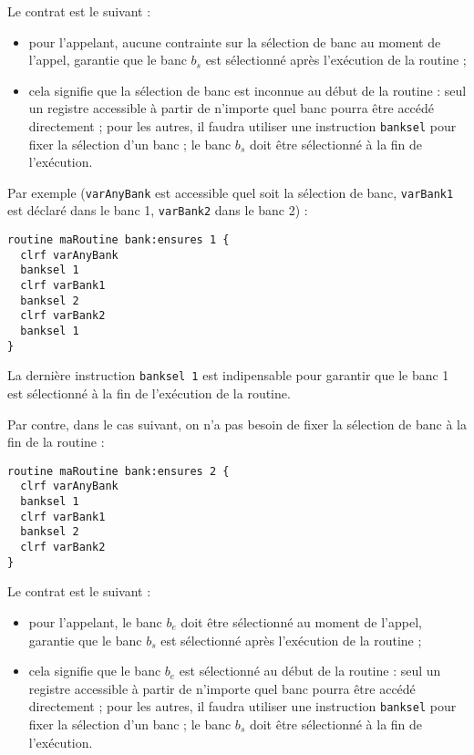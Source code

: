 Le contrat est le suivant :
\begin{itemize}
  \item pour l'appelant, aucune contrainte sur la sélection de banc au moment de l'appel, garantie que le banc $b_s$ est sélectionné après l'exécution de la routine ; 
  \item cela signifie que la sélection de banc est inconnue au début de la routine : seul un registre accessible à partir de n'importe quel banc pourra être accédé directement ; pour les autres, il faudra utiliser une instruction \texttt{banksel} pour fixer la sélection d'un banc ; le banc $b_s$ doit être sélectionné à la fin de l'exécution.
\end{itemize}

Par exemple (\texttt{varAnyBank} est accessible quel soit la sélection de banc, \texttt{varBank1} est déclaré dans le banc 1, \texttt{varBank2} dans le banc 2) :
\begin{lstlisting}[language=piccolo]
routine maRoutine bank:ensures 1 {
  clrf varAnyBank
  banksel 1
  clrf varBank1
  banksel 2
  clrf varBank2
  banksel 1
}
\end{lstlisting}

La dernière instruction \texttt{banksel 1} est indipensable pour garantir que le banc 1 est sélectionné à la fin de l'exécution de la routine.


Par contre, dans le cas suivant, on n'a pas besoin de fixer la sélection de banc à la fin de la routine :
\begin{lstlisting}[language=piccolo]
routine maRoutine bank:ensures 2 {
  clrf varAnyBank
  banksel 1
  clrf varBank1
  banksel 2
  clrf varBank2
}
\end{lstlisting}













Le contrat est le suivant :
\begin{itemize}
  \item pour l'appelant, le banc $b_e$ doit être sélectionné au moment de l'appel, garantie que le banc $b_s$ est sélectionné après l'exécution de la routine ; 
  \item cela signifie que le banc $b_e$ est sélectionné au début de la routine : seul un registre accessible à partir de n'importe quel banc pourra être accédé directement ; pour les autres, il faudra utiliser une instruction \texttt{banksel} pour fixer la sélection d'un banc ; le banc $b_s$ doit être sélectionné à la fin de l'exécution.
\end{itemize}

